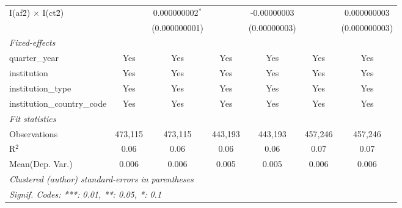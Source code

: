 \begin{tabular}{lcccccc}
   I(af\^2) $\times$ I(ct\^2)         &          & 0.000000002$^{*}$ &                 & -0.00000003    &               & 0.000000003\\   
                                      &          & (0.000000001)     &                 & (0.00000003)   &               & (0.000000003)\\   
   \midrule
   \emph{Fixed-effects}\\
   quarter\_year                      & Yes      & Yes               & Yes             & Yes            & Yes           & Yes\\  
   institution                        & Yes      & Yes               & Yes             & Yes            & Yes           & Yes\\  
   institution\_type                  & Yes      & Yes               & Yes             & Yes            & Yes           & Yes\\  
   institution\_country\_code         & Yes      & Yes               & Yes             & Yes            & Yes           & Yes\\  
   \midrule
   \emph{Fit statistics}\\
   Observations                       & 473,115  & 473,115           & 443,193         & 443,193        & 457,246       & 457,246\\  
   R$^2$                              & 0.06     & 0.06              & 0.06            & 0.06           & 0.07          & 0.07\\  
Mean(Dep. Var.) & 0.006 & 0.006 & 0.005 & 0.005 & 0.006 & 0.006 \\
   \midrule \midrule
   \multicolumn{7}{l}{\emph{Clustered (author) standard-errors in parentheses}}\\
   \multicolumn{7}{l}{\emph{Signif. Codes: ***: 0.01, **: 0.05, *: 0.1}}\\
\end{tabular}
\par\endgroup
